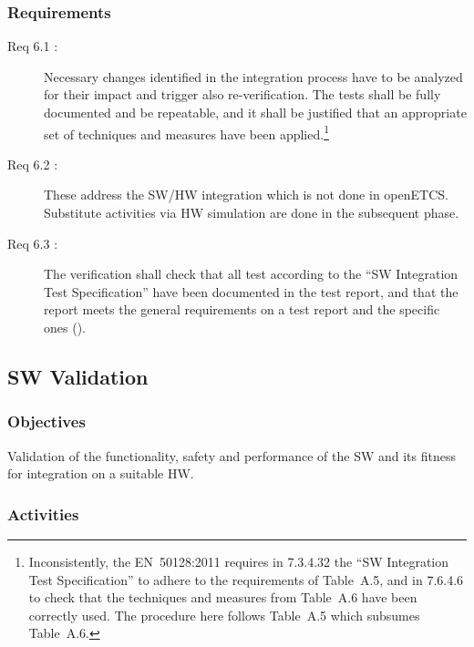 \documentclass{template/openetcs_article}
\begin{document}
\subsubsection{Requirements}
\label{sec:6-requirements}

\begin{description}
\item[Req 6.1 {\cite[7.6.4.1, 7.4.6.6]{EN50128:2011}}:] Necessary
  changes identified in the integration process have to be analyzed
  for their impact and trigger also re-verification. The tests shall
  be fully documented and be repeatable, and it shall be justified that an appropriate set of
  techniques and measures have been applied.\footnote{Inconsistently, the EN~50128:2011
    requires in 7.3.4.32 the ``SW Integration Test Specification'' to
    adhere to the requirements of Table~A.5, and in 7.6.4.6 to check
    that the techniques and measures from Table~A.6 have been
    correctly used. The procedure here follows Table~A.5 which subsumes Table~A.6.} 
\item[Req 6.2 {\cite[7.6.4.7 to 7.4.6.10]{EN50128:2011}}:] These address
  the SW/HW integration which is not done in openETCS. Substitute
  activities via HW simulation are done in the subsequent phase.
\item[Req 6.3 {\cite[7.6.4.11 to 7.4.6.13]{EN50128:2011}}:] The
  verification shall check that all test according to the ``SW
  Integration Test Specification'' have been documented in the test
  report, and that the report meets the general requirements on a test
  report and the specific ones (\cite[7.6.4.1,
  7.4.6.6]{EN50128:2011}).
\end{description}


\subsection{SW Validation}
\label{sec:sw-validation}


\subsubsection{Objectives}
\label{sec:7-objectives}

Validation of the functionality, safety and performance of the SW and
its fitness for integration on a suitable HW.

\subsubsection{Activities}
\label{sec:7-activities}
\end{document}

